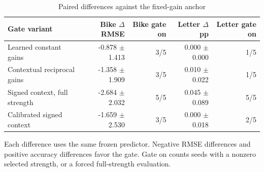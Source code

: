 \begin{table}[t]
\centering
\small
\caption{Paired differences against the fixed-gain anchor}
\label{tab:gating_ablation}
\begin{tabular}{@{}lrrrr@{}}
\toprule
\textbf{Gate variant} & \textbf{Bike \ensuremath{\Delta} RMSE} & \textbf{Bike gate on} & \textbf{Letter \ensuremath{\Delta} pp} & \textbf{Letter gate on} \\
\midrule
Learned constant gains & -0.878 \ensuremath{\pm} 1.413 & 3/5 & 0.000 \ensuremath{\pm} 0.000 & 1/5 \\
Contextual reciprocal gains & -1.358 \ensuremath{\pm} 1.909 & 3/5 & 0.010 \ensuremath{\pm} 0.022 & 1/5 \\
Signed context, full strength & -2.684 \ensuremath{\pm} 2.032 & 5/5 & 0.045 \ensuremath{\pm} 0.089 & 5/5 \\
Calibrated signed context & -1.659 \ensuremath{\pm} 2.530 & 3/5 & 0.000 \ensuremath{\pm} 0.018 & 2/5 \\
\bottomrule
\end{tabular}
\par\medskip
\begin{minipage}{0.98\linewidth}\footnotesize Each difference uses the same frozen predictor. Negative RMSE differences and positive accuracy differences favor the gate. Gate on counts seeds with a nonzero selected strength, or a forced full-strength evaluation.\end{minipage}
\end{table}
